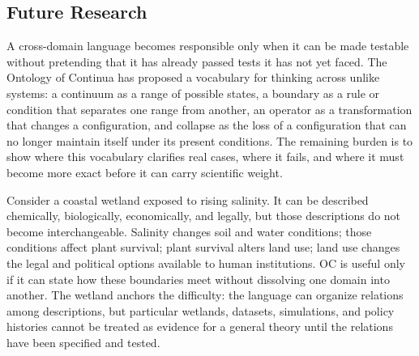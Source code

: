 \documentclass[11pt,a4paper,openany]{book}
\begin{document}
\subsection{Future Research}
A cross-domain language becomes responsible only when it can be made testable without pretending that it has already passed tests it has not yet faced. The Ontology of Continua has proposed a vocabulary for thinking across unlike systems: a continuum as a range of possible states, a boundary as a rule or condition that separates one range from another, an operator as a transformation that changes a configuration, and collapse as the loss of a configuration that can no longer maintain itself under its present conditions. The remaining burden is to show where this vocabulary clarifies real cases, where it fails, and where it must become more exact before it can carry scientific weight. \cite{haken_synergetics,nicolis_prigogine_selforg}\par
Consider a coastal wetland exposed to rising salinity. It can be described chemically, biologically, economically, and legally, but those descriptions do not become interchangeable. Salinity changes soil and water conditions; those conditions affect plant survival; plant survival alters land use; land use changes the legal and political options available to human institutions. OC is useful only if it can state how these boundaries meet without dissolving one domain into another. The wetland anchors the difficulty: the language can organize relations among descriptions, but particular wetlands, datasets, simulations, and policy histories cannot be treated as evidence for a general theory until the relations have been specified and tested.\par
\end{document}
